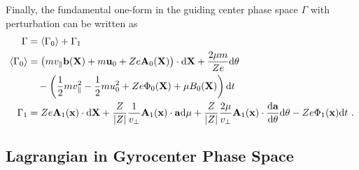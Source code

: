 Finally, the fundamental one-form in the guiding center phase space $\Gamma$ with perturbation can be written as
\begin{gather}
    \begin{aligned}
        \Gamma                   &= \langle \Gamma_0 \rangle + \Gamma_1 \\
        \langle \Gamma_0 \rangle &= \left(m v_\parallel \boldsymbol{\mathbf{b}}(\boldsymbol{\mathbf{X}}) + m\boldsymbol{\mathbf{u}}_0 + Ze\boldsymbol{\mathbf{A}}_0(\boldsymbol{\mathbf{X}})\right) \cdot \mathrm{d}\boldsymbol{\mathbf{X}} + \frac{2\mu m}{Ze} \mathrm{d}\theta \\
                                 &\quad - \left(\frac{1}{2}mv_\parallel^2 - \frac{1}{2}mu_0^2 + Ze\Phi_0(\boldsymbol{\mathbf{X}}) + \mu B_0(\boldsymbol{\mathbf{X}}) \right) \mathrm{d}t \\
        \Gamma_1                 &= Ze\boldsymbol{\mathbf{A}}_{1}(\boldsymbol{\mathbf{x}}) \cdot \mathrm{d}\boldsymbol{\mathbf{X}} + \frac{Z}{\abs{Z}} \frac{1}{v_\perp} \boldsymbol{\mathbf{A}}_1(\boldsymbol{\mathbf{x}}) \cdot \boldsymbol{\mathbf{a}} \mathrm{d}\mu + \frac{Z}{\abs{Z}} \frac{2\mu}{v_\perp} \boldsymbol{\mathbf{A}}_1(\boldsymbol{\mathbf{x}}) \cdot \frac{\mathrm{d}\boldsymbol{\mathbf{a}}}{\mathrm{d}\theta} \mathrm{d}\theta - Ze \Phi_1(\boldsymbol{\mathbf{x}}) \mathrm{d}t~. 
    \end{aligned}
\end{gather}

\newpage

\subsection{Lagrangian in Gyrocenter Phase Space}
\label{sub:gyrocenterLagrangian}

